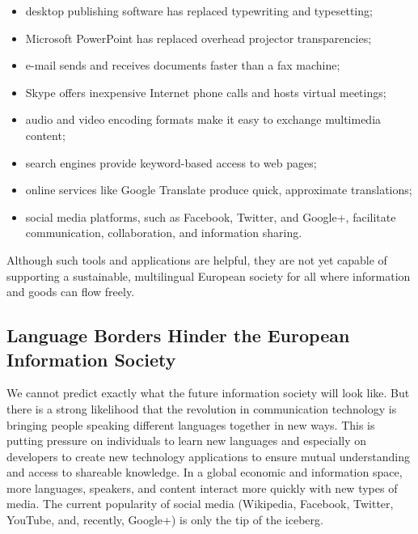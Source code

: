 \begin{multicols}{2}
\begin{itemize}
\item  desktop publishing software has replaced typewriting and typesetting;
\item  Microsoft PowerPoint has replaced overhead projector transparencies;
\item  e-mail sends and receives documents faster than a fax machine;
\item  Skype offers inexpensive Internet phone calls and hosts virtual meetings;
\item  audio and video encoding formats make it easy to exchange multimedia content;
\item  search engines provide keyword-based access to web pages;
\item  online services like Google Translate produce quick, approximate translations;
\item  social media platforms, such as Facebook, Twitter, and Google+, facilitate communication, collaboration, and information sharing.
\end{itemize}

Although such tools and applications are helpful, they are not yet capable of supporting a sustainable, multilingual European society for all where information and goods can flow freely.

\subsection[Language Borders Hinder the European Information Society]{Language Borders Hinder the European Information Society}

We cannot predict exactly what the future information society will look like.
But there is a strong likelihood that the revolution in communication technology is bringing people speaking different languages together in new ways.
This is putting pressure on individuals to learn new languages and especially on developers to create new technology applications to ensure mutual understanding and access to shareable knowledge.
In a global economic and information space, more languages, speakers, and content interact more quickly with new types of media.
The current popularity of social media (Wikipedia, Facebook, Twitter, YouTube, and, recently, Google+) is only the tip of the iceberg.



\end{multicols}
